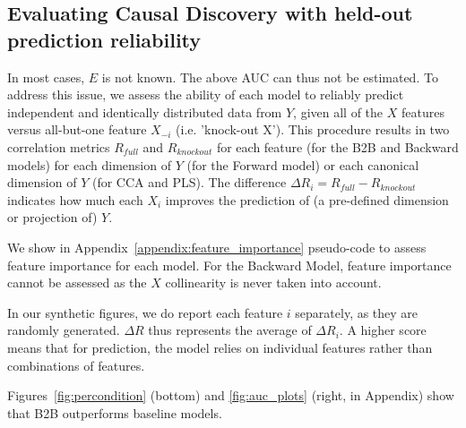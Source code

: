 \subsection{Evaluating Causal Discovery with held-out prediction reliability}

In most cases, $E$ is not known. The above AUC can thus not be estimated.
To address this issue, we assess the ability of each model to reliably predict
independent and identically distributed data from $Y$, given all of the $X$
features versus all-but-one feature $X_{-i}$ (i.e. 'knock-out X'). This
procedure results in two correlation metrics $R_{full}$ and $R_{knockout}$ for
each feature (for the B2B and Backward models) for each dimension of $Y$ (for
the Forward model) or each canonical dimension of $Y$ (for CCA and PLS). The
difference $\Delta R_i = R_{full}-R_{knockout}$ indicates how much each
$X_i$ improves the prediction of (a pre-defined dimension or projection of) $Y$.

We show in Appendix~\ref{appendix:feature_importance} pseudo-code to assess
feature importance for each model. For the Backward Model, feature importance
cannot be assessed as the $X$ collinearity is never
taken into account.

In our synthetic figures, we do report each feature $i$ separately, as they are
randomly generated. $\Delta R$ thus represents the average of $\Delta R_i$. A
higher score means that for prediction, the model relies on individual features
rather than combinations of features.

Figures~\ref{fig:percondition} (bottom) and \ref{fig:auc_plots} (right, in
Appendix) show that B2B outperforms baseline models.
